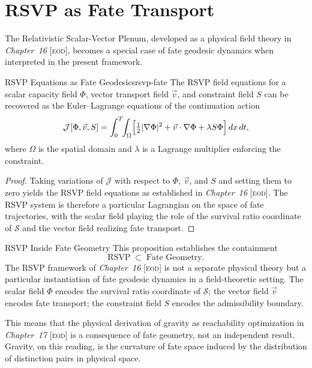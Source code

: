 \documentclass[12pt,twoside,openright]{book}
\newcommand{\fateSpace}{\mathcal{S}}
\newcommand{\EOD}[1]{\textit{#1} [\textsc{eod}]}
\providecommand{\contAction}{\mathcal{J}}
\begin{document}
\section{RSVP as Fate Transport}

The Relativistic Scalar-Vector Plenum, developed as a physical
field theory in \EOD{Chapter~16}, becomes a special case of
fate geodesic dynamics when interpreted in the present framework.

\begin{proposition}{RSVP Equations as Fate Geodesics}{rsvp-fate}
The RSVP field equations for a scalar capacity field $\Phi$,
vector transport field $\vec{v}$, and constraint field $S$
can be recovered as the Euler--Lagrange equations of the
continuation action
\[
  \contAction[\Phi,\vec{v},S]
  = \int_0^T\!\!\int_\Omega
  \Bigl[
    \tfrac{1}{2}|\nabla\Phi|^2
    + \vec{v}\cdot\nabla\Phi
    + \lambda S\Phi
  \Bigr]\,dx\,dt,
\]
where $\Omega$ is the spatial domain and $\lambda$ is a
Lagrange multiplier enforcing the constraint.
\begin{proof}
Taking variations of $\contAction$ with respect to $\Phi$,
$\vec{v}$, and $S$ and setting them to zero yields the
RSVP field equations as established in \EOD{Chapter~16}.
The RSVP system is therefore a particular Lagrangian on the
space of fate trajectories, with the scalar field playing
the role of the survival ratio coordinate of $\fateSpace$
and the vector field realizing fate transport.
\end{proof}
\end{proposition}

\begin{trilogylink}{RSVP Inside Fate Geometry}
This proposition establishes the containment
\[
  \text{RSVP} \;\subset\; \text{Fate Geometry}.
\]
The RSVP framework of \EOD{Chapter~16} is not a separate
physical theory but a particular instantiation of fate geodesic
dynamics in a field-theoretic setting. The scalar field $\Phi$
encodes the survival ratio coordinate of $\fateSpace$; the
vector field $\vec{v}$ encodes fate transport; the constraint
field $S$ encodes the admissibility boundary.

This means that the physical derivation of gravity as
reachability optimization in \EOD{Chapter~17} is a consequence
of fate geometry, not an independent result. Gravity, on this
reading, is the curvature of fate space induced by the
distribution of distinction pairs in physical space.
\end{trilogylink}
\end{document}
